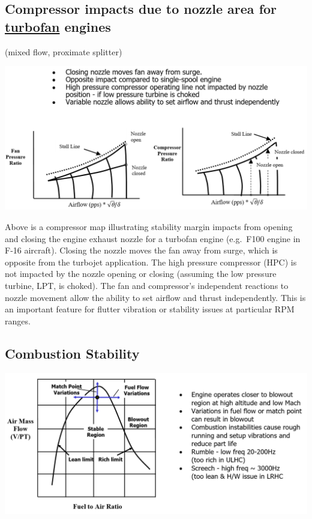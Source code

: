 \documentclass[
]{book}
\begin{document}
\hypertarget{compressor-impacts-due-to-nozzle-area-for-turbofan-engines}{%
\subsection{\texorpdfstring{Compressor impacts due to nozzle area for \underline{turbofan} engines}{Compressor impacts due to nozzle area for turbofan engines}}\label{compressor-impacts-due-to-nozzle-area-for-turbofan-engines}}

(mixed flow, proximate splitter)

\includegraphics{media/17/turbofan-open-close-nozzle-compressor-map.png}

Above is a compressor map illustrating stability margin impacts from opening and
closing the engine exhaust nozzle for a turbofan engine (e.g.~F100 engine in
F-16 aircraft). Closing the nozzle moves the fan away from surge, which is
opposite from the turbojet application. The high pressure compressor (HPC) is
not impacted by the nozzle opening or closing (assuming the low pressure
turbine, LPT, is choked). The fan and compressor's independent reactions to
nozzle movement allow the ability to set airflow and thrust independently. This
is an important feature for flutter vibration or stability issues at particular
RPM ranges.

\hypertarget{combustion-stability}{%
\subsection{Combustion Stability}\label{combustion-stability}}

\includegraphics{media/17/combustion-stability.png}
\end{document}
